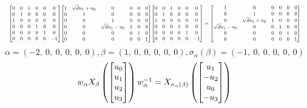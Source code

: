\documentclass[11pt]{article}
\theoremstyle{definition}
\begin{document}
\[
\scaletoalign{\textwidth}{{\left[\begin{matrix}0 & 0 & 1 & 0 & 0 & 0\\0 & 1 & 0 & 0 & 0 & 0\\1 & 0 & 0 & 0 & 0 & 0\\0 & 0 & 0 & 1 & 0 & 0\\0 & 0 & 0 & 0 & 1 & 0\\0 & 0 & 0 & 0 & 0 & -1\end{matrix}\right]} {\left[\begin{matrix}1 & \sqrt{d} u_{1} + u_{0} & 0 & 0 & 0 & 0\\0 & 1 & 0 & 0 & 0 & 0\\0 & 0 & 1 & 0 & 0 & 0\\0 & 0 & \sqrt{d} u_{1} - u_{0} & 1 & 0 & 0\\0 & 0 & 0 & 0 & 1 & 0\\0 & 0 & 0 & 0 & 0 & 1\end{matrix}\right]} {\left[\begin{matrix}0 & 0 & 1 & 0 & 0 & 0\\0 & 1 & 0 & 0 & 0 & 0\\1 & 0 & 0 & 0 & 0 & 0\\0 & 0 & 0 & 1 & 0 & 0\\0 & 0 & 0 & 0 & 1 & 0\\0 & 0 & 0 & 0 & 0 & -1\end{matrix}\right]} = {\left[\begin{matrix}1 & 0 & 0 & 0 & 0 & 0\\0 & 1 & 0 & 0 & 0 & 0\\0 & \sqrt{d} u_{1} + u_{0} & 1 & 0 & 0 & 0\\\sqrt{d} u_{1} - u_{0} & 0 & 0 & 1 & 0 & 0\\0 & 0 & 0 & 0 & 1 & 0\\0 & 0 & 0 & 0 & 0 & 1\end{matrix}\right]}}
\]
\[
\alpha = \left( -2, \  0, \  0, \  0, \  0, \  0\right), \beta = \left( 1, \  0, \  0, \  0, \  0, \  0\right), \sigma_{\alpha}(\beta) = \left( -1, \  0, \  0, \  0, \  0, \  0\right)
\]
\[
\scaletoalign{\textwidth}{w_{\alpha} X_{\beta}\left(\left[\begin{matrix}u_{0}\\u_{1}\\u_{2}\\u_{3}\end{matrix}\right]\right) w_{\alpha}^{-1} = X_{\sigma_{\alpha}\left(\beta\right)}\left(\left[\begin{matrix}u_{1}\\- u_{2}\\u_{0}\\- u_{3}\end{matrix}\right]\right)}
\]
\end{document}
